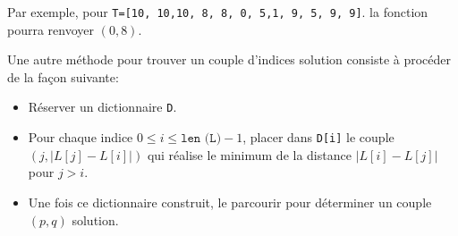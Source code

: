 Par exemple, pour \texttt{T=[10, 10,10, 8, 8, 0, 5,1, 9, 5, 9, 9]}. la fonction pourra renvoyer $(0,8)$.

\bigskip 

Une autre méthode pour trouver un couple d'indices solution consiste à procéder de la façon suivante:

\begin{itemize}\item Réserver un dictionnaire \texttt{D}.
	
	\item  Pour chaque indice $0\le i\le \texttt{len (L)}-1$, placer dans \texttt{D[i]} le couple $(j,|L[j]-L[i]|)$ qui réalise le minimum de la distance $|L[i]-L[j]|$ pour $j>i$.
	
	\item Une fois ce dictionnaire construit, le parcourir pour déterminer un couple $(p,q)$ solution.
	
\end{itemize}

\medskip {}


